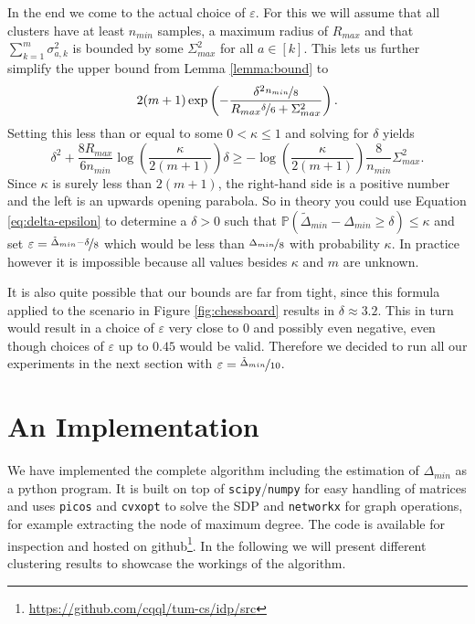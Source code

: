 \documentclass[10pt,a4paper]{article}
\begin{document}
In the end we come to the actual choice of $\varepsilon$.
For this we will assume that all clusters have at least $n_{min}$ samples, a maximum radius of $R_{max}$ and that $\sum_{k = 1}^{m} \sigma_{a,k}^{2}$ is bounded by some $\Sigma_{max}^{2}$ for all $a \in [k]$.
This lets us further simplify the upper bound from Lemma \ref{lemma:bound} to
\begin{equation*}
  2(m + 1)\exp\left( -\frac{\delta^{2} \nicefrac{n_{min}}{8}}{R_{max} \nicefrac{\delta}{6} + \Sigma_{max}^{2}} \right).
\end{equation*}
Setting this less than or equal to some $0 < \kappa \le 1$ and solving for $\delta$ yields
\begin{equation}
  \delta^{2} + \frac{8R_{max}}{6n_{min}}\log\left( \frac{\kappa}{2(m + 1)} \right)\delta \ge -\log\left( \frac{\kappa}{2(m + 1)} \right)\frac{8}{n_{min}}\Sigma_{max}^{2}.
  \label{eq:delta-epsilon}
\end{equation}
Since $\kappa$ is surely less than $2(m + 1)$, the right-hand side is a positive number and the left is an upwards opening parabola.
So in theory you could use Equation \eqref{eq:delta-epsilon} to determine a $\delta > 0$ such that $\mathbb{P}(\tilde{\Delta}_{min} - \Delta_{min} \ge \delta) \le \kappa$ and set $\varepsilon = \nicefrac{\tilde{\Delta}_{min} - \delta}{8}$ which would be less than $\nicefrac{\Delta_{min}}{8}$ with probability $\kappa$.
In practice however it is impossible because all values besides $\kappa$ and $m$ are unknown.

It is also quite possible that our bounds are far from tight, since this formula applied to the scenario in Figure \ref{fig:chessboard} results in $\delta \approx 3.2$.
This in turn would result in a choice of $\varepsilon$ very close to $0$ and possibly even negative, even though choices of $\varepsilon$ up to $0.45$ would be valid.
Therefore we decided to run all our experiments in the next section with $\varepsilon = \nicefrac{\tilde{\Delta}_{min}}{10}$.

\section{An Implementation}
\label{sec:results}

We have implemented the complete algorithm including the estimation of $\Delta_{min}$ as a python program.
It is built on top of \texttt{scipy}/\texttt{numpy} for easy handling of matrices and uses \texttt{picos} and \texttt{cvxopt} to solve the SDP and \texttt{networkx} for graph operations, for example extracting the node of maximum degree.
The code is available for inspection and hosted on github\footnote{\url{https://github.com/cqql/tum-cs/idp/src}}.
In the following we will present different clustering results to showcase the workings of the algorithm.
\end{document}
